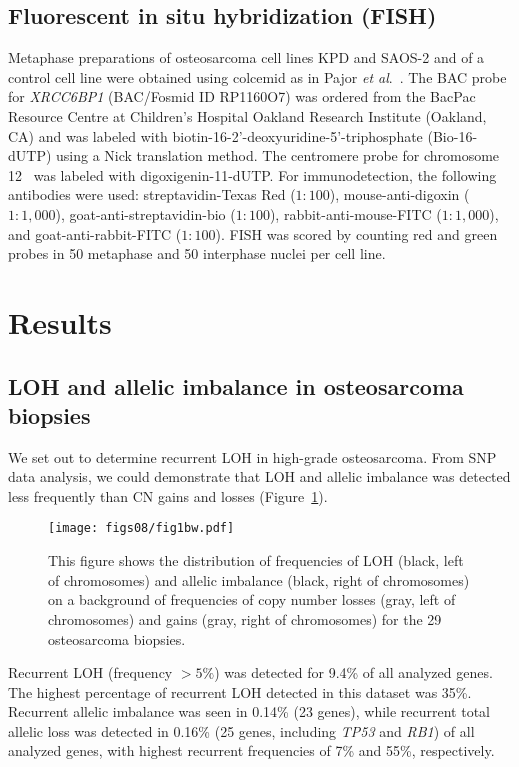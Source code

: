 \subsection{Fluorescent in situ hybridization (FISH)}
Metaphase preparations of osteosarcoma cell lines KPD and SAOS-2 and of a control cell line were obtained using colcemid as in Pajor {\it et al}.~\cite{pajor1998combined}. The BAC probe for {\it XRCC6BP1} (BAC/Fosmid ID RP1160O7) was ordered from the BacPac Resource Centre at Children's Hospital Oakland Research Institute (Oakland, CA) and was labeled with biotin\hyp{}16-2'\hyp{}deoxyuridine\hyp{}5'\hyp{}triphosphate (Bio-16-dUTP) using a Nick translation method. The centromere probe for chromosome 12~\cite{pajor1998combined} was labeled with digoxigenin\hyp{}11-dUTP. For immunodetection, the following antibodies were used: streptavidin\hyp{}Texas Red ($1:100$), mouse\hyp{}anti\hyp{}digoxin ($1:1,000$), goat\hyp{}anti\hyp{}streptavidin\hyp{}bio ($1:100$), rabbit\hyp{}anti\hyp{}mouse\hyp{}FITC ($1:1,000$), and goat\hyp{}anti\hyp{}rabbit\hyp{}FITC ($1:100$). FISH was scored by counting red and green probes in 50 metaphase and 50 interphase nuclei per cell line.

\section{Results}\label{results8}
\subsection{LOH and allelic imbalance in osteosarcoma biopsies}
We set out to determine recurrent LOH in high\hyp{}grade osteosarcoma. From SNP data analysis, we could demonstrate that LOH and allelic imbalance was detected less frequently than CN gains and losses (Figure~\ref{fig8.1}).
%
\begin{figure}[htbp]
	\centering
	\texttt{[image: figs08/fig1bw.pdf]}	%
	\caption{This figure shows the distribution of frequencies of LOH (black, left of chromosomes) and allelic imbalance (black, right of chromosomes) on a background of frequencies of copy number losses (gray, left of chromosomes) and gains (gray, right of chromosomes) for the 29 osteosarcoma biopsies.} %
	\label{fig8.1}
\end{figure}
%
Recurrent LOH (frequency $>5\%$) was detected for 9.4\% of all analyzed genes. The highest percentage of recurrent LOH detected in this dataset was 35\%. Recurrent allelic imbalance was seen in 0.14\% (23 genes), while recurrent total allelic loss was detected in 0.16\% (25 genes, including {\it TP53} and {\it RB1}) of all analyzed genes, with highest recurrent frequencies of 7\% and 55\%, respectively.

